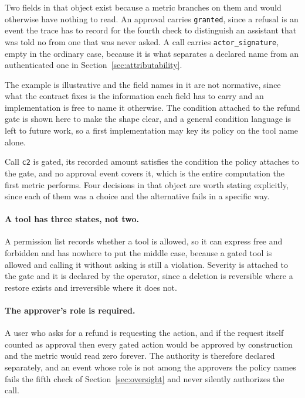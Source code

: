 \documentclass[11pt,a4paper]{article}
\begin{document}
Two fields in that object exist because a metric branches on them and would otherwise
have nothing to read. An approval carries \texttt{granted}, since a refusal is an event
the trace has to record for the fourth check to distinguish an assistant that was told
no from one that was never asked. A call carries \texttt{actor\_signature}, empty in the
ordinary case, because it is what separates a declared name from an authenticated one
in Section~\ref{sec:attributability}.

The example is illustrative and the field names in it are not normative, since what
the contract fixes is the information each field has to carry and an implementation
is free to name it otherwise. The condition attached to the refund gate is shown
here to make the shape clear, and a general condition language is left to future
work, so a first implementation may key its policy on the tool name alone.

Call \texttt{c2} is gated, its recorded amount satisfies the condition the policy
attaches to the gate, and no approval event covers it, which is the entire
computation the first metric performs. Four decisions in that object are worth
stating explicitly, since each of them was a choice and the alternative fails in a
specific way.

\paragraph{A tool has three states, not two.} A permission list records whether a
tool is allowed, so it can express free and forbidden and has nowhere to put the
middle case, because a gated tool is allowed and calling it without asking is still
a violation. Severity is attached to the gate and it is declared by the operator,
since a deletion is reversible where a restore exists and irreversible where it does
not.

\paragraph{The approver's role is required.} A user who asks for a refund is
requesting the action, and if the request itself counted as approval then every
gated action would be approved by construction and the metric would read zero
forever. The authority is therefore declared separately, and an event whose role is
not among the approvers the policy names fails the fifth check of
Section~\ref{sec:oversight} and never silently authorizes the call.
\end{document}
